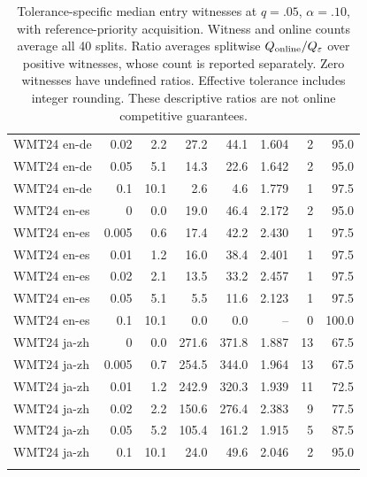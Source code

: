 \begin{table}[t]
\begin{tabular}{lrrrrrrr}
WMT24 en-de & 0.02 & 2.2 & 27.2 & 44.1 & 1.604 & 2 & 95.0 \\
WMT24 en-de & 0.05 & 5.1 & 14.3 & 22.6 & 1.642 & 2 & 95.0 \\
WMT24 en-de & 0.1 & 10.1 & 2.6 & 4.6 & 1.779 & 1 & 97.5 \\
\addlinespace
WMT24 en-es & 0 & 0.0 & 19.0 & 46.4 & 2.172 & 2 & 95.0 \\
WMT24 en-es & 0.005 & 0.6 & 17.4 & 42.2 & 2.430 & 1 & 97.5 \\
WMT24 en-es & 0.01 & 1.2 & 16.0 & 38.4 & 2.401 & 1 & 97.5 \\
WMT24 en-es & 0.02 & 2.1 & 13.5 & 33.2 & 2.457 & 1 & 97.5 \\
WMT24 en-es & 0.05 & 5.1 & 5.5 & 11.6 & 2.123 & 1 & 97.5 \\
WMT24 en-es & 0.1 & 10.1 & 0.0 & 0.0 & -- & 0 & 100.0 \\
\addlinespace
WMT24 ja-zh & 0 & 0.0 & 271.6 & 371.8 & 1.887 & 13 & 67.5 \\
WMT24 ja-zh & 0.005 & 0.7 & 254.5 & 344.0 & 1.964 & 13 & 67.5 \\
WMT24 ja-zh & 0.01 & 1.2 & 242.9 & 320.3 & 1.939 & 11 & 72.5 \\
WMT24 ja-zh & 0.02 & 2.2 & 150.6 & 276.4 & 2.383 & 9 & 77.5 \\
WMT24 ja-zh & 0.05 & 5.2 & 105.4 & 161.2 & 1.915 & 5 & 87.5 \\
WMT24 ja-zh & 0.1 & 10.1 & 24.0 & 49.6 & 2.046 & 2 & 95.0 \\
\addlinespace
\bottomrule
\end{tabular}
\caption{Tolerance-specific median entry witnesses at $q=.05$, $\alpha=.10$, with reference-priority acquisition. Witness and online counts average all 40 splits. Ratio averages splitwise $Q_{\rm online}/Q_\varepsilon$ over positive witnesses, whose count is reported separately. Zero witnesses have undefined ratios. Effective tolerance includes integer rounding. These descriptive ratios are not online competitive guarantees.}
\label{tab:tolerance-witness}
\end{table}
